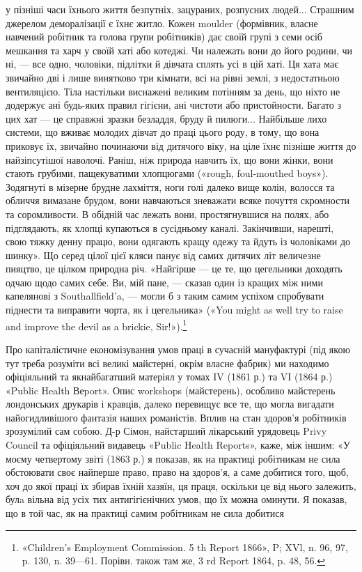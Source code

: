 \parcont{}  %
у пізніші часи їхнього життя безпутніх, зацураних, розпусних
людей... Страшним джерелом деморалізації є їхнє житло. Кожен
moulder (формівник, власне навчений робітник та голова групи
робітників) дає своїй групі з семи осіб мешкання та харч у своїй
хаті або котеджі. Чи належать вони до його родини, чи ні, — все
одно, чоловіки, підлітки й дівчата сплять усі в цій хаті. Ця хата
має звичайно дві і лише винятково три кімнати, всі на рівні землі,
з недостатньою вентиляцією. Тіла настільки виснажені великим
потінням за день, що ніхто не додержує ані будь-яких правил
гігієни, ані чистоти або пристойности. Багато з цих хат — це
справжні зразки безладдя, бруду й пилюги... Найбільше лихо
системи, що вживає молодих дівчат до праці цього роду, в тому,
що вона приковує їх, звичайно починаючи від дитячого віку, на
ціле їхнє пізніше життя до найзіпсутішої наволочі. Раніш, ніж
природа навчить їх, що вони жінки, вони стають грубими, пащекуватими
хлопцюгами («rough, foul-mouthed boys»). Зодягнуті
в мізерне брудне лахміття, ноги голі далеко вище колін, волосся
та обличчя вимазане брудом, вони навчаються зневажати всяке
почуття скромности та соромливости. В обідній час лежать вони,
простягнувшися на полях, або підглядають, як хлопці купаються
в сусідньому каналі. Закінчивши, нарешті, свою тяжку денну
працю, вони одягають кращу одежу та йдуть із чоловіками до
шинку». Що серед цілої цієї кляси панує від самих дитячих літ
величезне пияцтво, це цілком природна річ. «Найгірше — це те,
що цегельники доходять одчаю щодо самих себе. Ви, мій пане, —
сказав один із кращих між ними капелянові з Southallfield’a, —
могли б з таким самим успіхом спробувати піднести та виправити
чорта, як і цегельника» («You might as well try to raise and
improve the devil as a brickie, Sir!»).\footnote{
«Children’s Employment Commission. 5 th Report 1866», P; XVl,
n. 96, 97, p. 130, n. 39—61. Порівн. також там же, 3 rd Report 1864,
p. 48, 56.
}

Про капіталістичне економізування умов праці в сучасній
мануфактурі (під якою тут треба розуміти всі великі майстерні,
окрім власне фабрик) ми находимо офіціяльний та якнайбагатший
матеріял у томах IV (1861 р.) та VI (1864 р.) «Public Health Веport».
Опис workshops (майстерень), особливо майстерень лондонських
друкарів і кравців, далеко перевищує все те, що могла вигадати
найогидливішого фантазія наших романістів. Вплив на
стан здоров’я робітників зрозумілий сам собою. Д-р Сімон, найстарший
лікарський урядовець Privy Council та офіціяльний
видавець «Public Health Reports», каже, між іншим: «У моєму
четвертому звіті (1863 р.) я показав, як на практиці робітникам
не сила обстоювати своє найперше право, право на здоров’я,
а саме добитися того, щоб, хоч до якої праці їх збирав їхній хазяїн,
ця праця, оскільки це від нього залежить, булa вільна від
усіх тих антигігієнічних умов, що їх можна оминути. Я показав,
що в той час, як на практиці самим робітникам не сила добитися
\parbreak{}  %
